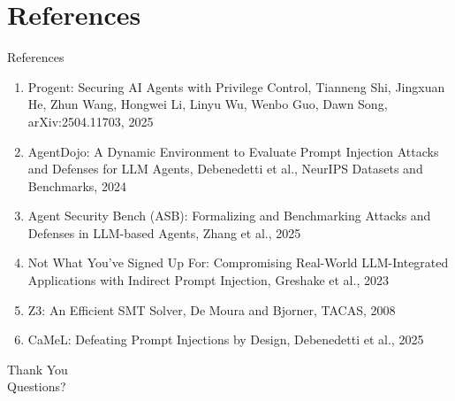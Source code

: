 \documentclass[10pt]{beamer}
\begin{document}
\section{References}
\begin{frame}[allowframebreaks]{References}
  \footnotesize
  \begin{enumerate}
    \item Progent: Securing AI Agents with Privilege Control, Tianneng Shi, Jingxuan He, Zhun Wang, Hongwei Li, Linyu Wu, Wenbo Guo, Dawn Song, arXiv:2504.11703, 2025
    \item AgentDojo: A Dynamic Environment to Evaluate Prompt Injection Attacks and Defenses for LLM Agents, Debenedetti et al., NeurIPS Datasets and Benchmarks, 2024
    \item Agent Security Bench (ASB): Formalizing and Benchmarking Attacks and Defenses in LLM-based Agents, Zhang et al., 2025
    \item Not What You've Signed Up For: Compromising Real-World LLM-Integrated Applications with Indirect Prompt Injection, Greshake et al., 2023
    \item Z3: An Efficient SMT Solver, De Moura and Bjorner, TACAS, 2008
    \item CaMeL: Defeating Prompt Injections by Design, Debenedetti et al., 2025
  \end{enumerate}
\end{frame}

\begin{frame}[plain]
  \begin{center}
    {\Huge Thank You}\\[1em]
    {\large Questions?}
  \end{center}
\end{frame}
\end{document}
